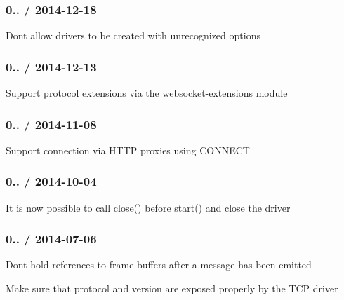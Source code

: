 \subsubsection*{0.. / 2014-\/12-\/18}


\begin{DoxyItemize}
\item Don\textquotesingle{}t allow drivers to be created with unrecognized options
\end{DoxyItemize}

\subsubsection*{0.. / 2014-\/12-\/13}


\begin{DoxyItemize}
\item Support protocol extensions via the websocket-\/extensions module
\end{DoxyItemize}

\subsubsection*{0.. / 2014-\/11-\/08}


\begin{DoxyItemize}
\item Support connection via H\+T\+TP proxies using {\ttfamily C\+O\+N\+N\+E\+CT}
\end{DoxyItemize}

\subsubsection*{0.. / 2014-\/10-\/04}


\begin{DoxyItemize}
\item It is now possible to call {\ttfamily close()} before {\ttfamily start()} and close the driver
\end{DoxyItemize}

\subsubsection*{0.. / 2014-\/07-\/06}


\begin{DoxyItemize}
\item Don\textquotesingle{}t hold references to frame buffers after a message has been emitted
\item Make sure that {\ttfamily protocol} and {\ttfamily version} are exposed properly by the T\+CP driver
\end{DoxyItemize}

